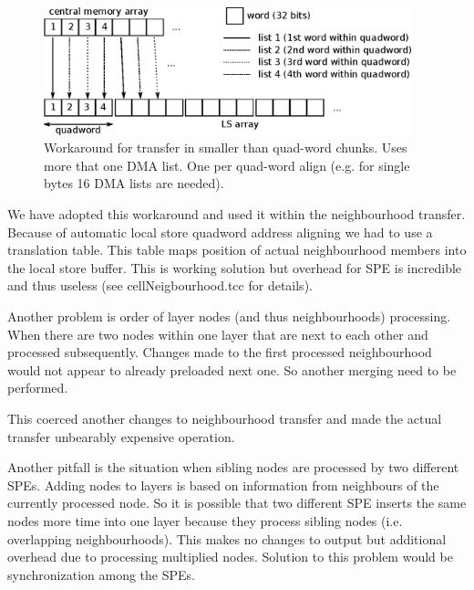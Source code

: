 \begin{figure}
    \centering
    \includegraphics[width=0.95\textwidth]{data/multipleDMAList}
    \caption[Multiple DMA list workaround]
{
  Workaround for transfer in smaller than quad-word chunks.
  Uses more that one DMA list.
  One per quad-word align (e.g. for single bytes 16 DMA lists are needed).
}
    \label{fg:multipleDMAList}
\end{figure}

We have adopted this workaround and used it within the neighbourhood transfer.
Because of automatic local store quadword address aligning we had to use a translation table.
This table maps position of actual neighbourhood members into the local store buffer.
This is working solution but overhead for SPE is incredible and thus useless (see cellNeigbourhood.tcc for details).

\par
\label{neighbourhoodDependecy}
Another problem is order of layer nodes (and thus neighbourhoods) processing.
When there are two nodes within one layer that are next to each other and processed subsequently.
Changes made to the first processed neighbourhood would not appear to already preloaded next one.
So another merging need to be performed.

\par
This coerced another changes to neighbourhood transfer and made the actual transfer unbearably expensive operation.

\par
\label{workDependecy}
Another pitfall is the situation when sibling nodes are processed by two different SPEs.
Adding nodes to layers is based on information from neighbours of the currently processed node.
So it is possible that two different SPE inserts the same nodes more time into one layer because they process sibling nodes (i.e. overlapping neighbourhoods).
This makes no changes to output but additional overhead due to processing multiplied nodes.
Solution to this problem would be synchronization among the SPEs.

